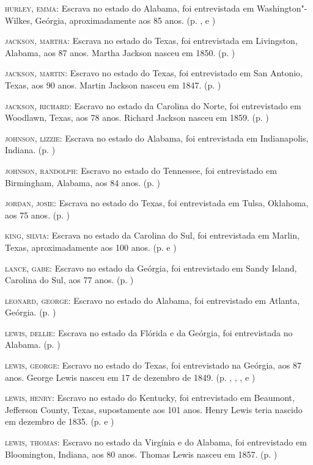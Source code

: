 \begin{Parskip}
\textsc{hurley, emma:} Escrava no estado do Alabama, foi entrevistada em
Washington"-Wilkes, Geórgia, aproximadamente aos 85 anos. (p. \pageref{ref157}, \pageref{ref158} e \pageref{ref159})

\textsc{jackson, martha:} Escrava no estado do Texas, foi entrevistada
em Livingston, Alabama, aos 87 anos. Martha Jackson nasceu em 1850. (p. \pageref{ref160})

\textsc{jackson, martin:} Escravo no estado do Texas, foi entrevistado
em San Antonio, Texas, aos 90 anos. Martin Jackson nasceu em 1847. (p. \pageref{ref161})

\textsc{jackson, richard:} Escravo no estado da Carolina do Norte, foi
entrevistado em Woodlawn, Texas, aos 78 anos. Richard Jackson nasceu em
1859. (p. \pageref{ref162})

\textsc{johnson, lizzie:} Escrava no estado do Alabama, foi entrevistada
em Indianapolis, Indiana. (p. \pageref{ref163})

\textsc{johnson, randolph:} Escravo no estado do Tennessee, foi
entrevistado em Birmingham, Alabama, aos 84 anos. (p. \pageref{ref164})

\textsc{jordan, josie:} Escrava no estado do Texas, foi entrevistada em
Tulsa, Oklahoma, aos 75 anos. (p. \pageref{ref165})

\textsc{king, silvia:} Escrava no estado da Carolina do Sul, foi
entrevistada em Marlin, Texas, aproximadamente aos 100 anos. (p. \pageref{ref166} e \pageref{ref167})

\textsc{lance, gabe:} Escravo no estado da Geórgia, foi entrevistado em
Sandy Island, Carolina do Sul, aos 77 anos. (p. \pageref{ref168})

\textsc{leonard, george:} Escravo no estado do Alabama, foi entrevistado
em Atlanta, Geórgia. (p. \pageref{ref169})

\textsc{lewis, dellie:} Escrava no estado da Flórida e da Geórgia, foi
entrevistada no Alabama. (p. \pageref{ref170})

\textsc{lewis, george:} Escravo no estado do Texas, foi entrevistado na
Geórgia, aos 87 anos. George Lewis nasceu em 17 de dezembro de 1849. (p. \pageref{ref171}, \pageref{ref172}, \pageref{ref173}, \pageref{ref174} e \pageref{ref175})

\textsc{lewis, henry:} Escravo no estado do Kentucky, foi entrevistado
em Beaumont, Jefferson County, Texas, supostamente aos 101 anos. Henry
Lewis teria nascido em dezembro de 1835. (p. \pageref{ref176} e \pageref{ref177})

\textsc{lewis, thomas:} Escravo no estado da Virgínia e do Alabama, foi
entrevistado em Bloomington, Indiana, aos 80 anos. Thomas Lewis nasceu
em 1857. (p. \pageref{ref178})


\end{Parskip}
